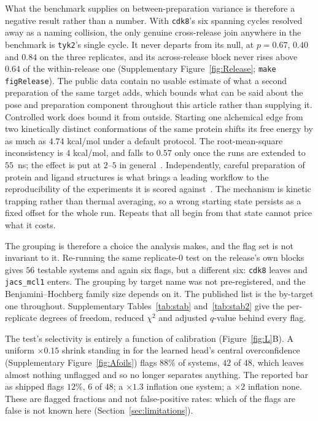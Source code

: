 What the benchmark supplies on between-preparation variance is therefore a negative result rather
than a number. With \texttt{cdk8}'s six spanning cycles resolved away as a naming collision, the
only genuine cross-release join anywhere in the benchmark is \texttt{tyk2}'s single cycle. It
never departs from its null, at $p=0.67$, $0.40$ and $0.84$ on the three replicates, and its
across-release block never rises above $0.64$ of the within-release one (Supplementary
Figure~\ref{fig:Release}; \texttt{make figRelease}).
The public data contain no usable estimate of what a second preparation of the same target adds,
which bounds what can be said about the pose and preparation component throughout this article
rather than supplying it. Controlled work does bound it from outside. Starting one alchemical edge
from two kinetically distinct conformations of the same protein shifts its free energy by as much
as $4.74$ kcal/mol under a default protocol. The root-mean-square inconsistency is $4$ kcal/mol,
and falls to $0.57$ only once the runs are extended to $55$~ns; the effect is put at $2$--$5$ in
general~\citep{lim2016sensitivity}. Independently, careful preparation of protein and ligand
structures is what brings a leading workflow to the reproducibility of the experiments it is
scored against~\citep{ross2023maximal}. The mechanism is kinetic trapping rather than thermal
averaging, so a wrong starting state persists as a fixed offset for the whole run. Repeats that all begin from
that state cannot price what it costs.

The grouping is therefore a choice the analysis makes, and the flag set is not invariant to it.
Re-running the same replicate-0 test on the release's own blocks gives $56$ testable systems and
again six flags, but a different six: \texttt{cdk8} leaves and \texttt{jacs\_mcl1} enters. The
grouping by target name was not pre-registered, and the Benjamini--Hochberg family size depends on
it. The published list is the by-target one throughout. Supplementary Tables~\ref{tab:stab}
and~\ref{tab:stab2} give the per-replicate degrees of freedom, reduced $\chi^2$ and adjusted
$q$-value behind every flag.

The test's selectivity is entirely a function of calibration (Figure~\ref{fig:L}B). A uniform
${\times}0.15$ shrink standing in for the learned head's central overconfidence (Supplementary
Figure~\ref{fig:Afoils}) flags $88\%$ of systems, $42$ of $48$, which leaves almost nothing
unflagged and so no longer separates anything. The reported bar as shipped flags $12\%$, $6$ of
$48$; a $\times1.3$ inflation one system; a $\times2$ inflation none. These are flagged
fractions and not false-positive rates: which of the flags are false is not known here
(Section~\ref{sec:limitations}).

